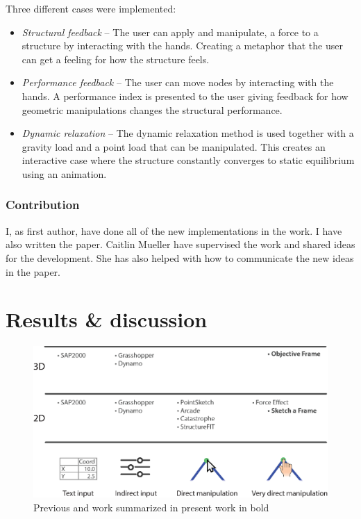 Three different cases were implemented:

\begin{itemize} 
\item \textit{Structural feedback} – The user can apply and manipulate, a force to a structure by interacting with the hands. Creating a metaphor that the user can get a feeling for how the structure feels.
\item \textit{Performance feedback} – The user can move nodes by interacting with the hands. A performance index is presented to the user giving feedback for how geometric manipulations changes the structural performance.
\item \textit{Dynamic relaxation} – The dynamic relaxation method is used together with a gravity load and a point load that can be manipulated. This creates an interactive case where the structure constantly converges to static equilibrium using an animation.
\end{itemize} 

\subsection*{Contribution}

I, as first author, have done all of the new implementations in the work. I have also written the paper. Caitlin Mueller have supervised the work and shared ideas for the development. She has also helped with how to communicate the new ideas in the paper.

\chapter{Results \& discussion}
\label{ch:Results discussion}
\begin{figure}
  \includegraphics[width=330pt]{graphics/softwareReview.eps}
  \caption{Previous and work summarized in present work in bold}
  \label{fig:softwareReview}
\end{figure}

